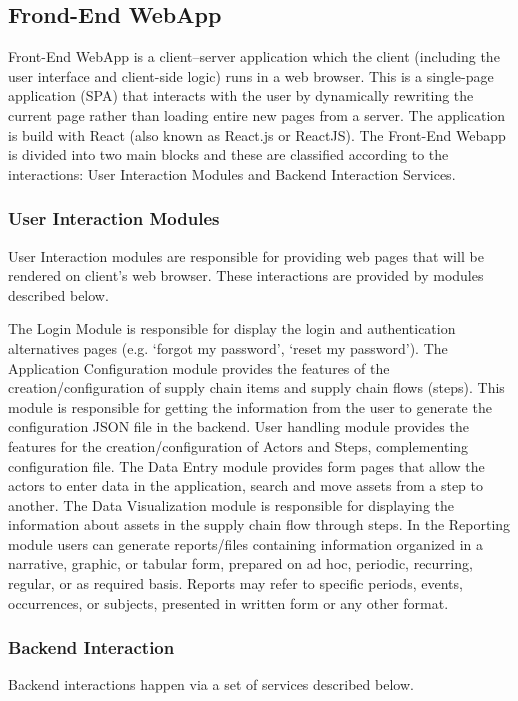 \subsection{Frond-End WebApp}\label{sec:WebAppFrondEnd}
Front-End WebApp is a client–server application which the client (including the user interface and client-side logic) runs in a web browser. This is a single-page application (SPA) that interacts with the user by dynamically rewriting the current page rather than loading entire new pages from a server. The application is build with React (also known as React.js or ReactJS). The Front-End Webapp is divided into two main blocks and these are classified according to the interactions: User Interaction Modules and Backend Interaction Services.

\subsubsection{User Interaction Modules}\label{sec:UserInteraction}
User Interaction modules are responsible for providing web pages that will be rendered on client’s web browser. These interactions are provided by modules described below.

The Login Module is responsible for display the login and authentication alternatives pages (e.g. ‘forgot my password’, ‘reset my password’). The Application Configuration module provides the features of the creation/configuration of supply chain items and supply chain flows (steps). This module is responsible for getting the information from the user to generate the configuration JSON file in the backend. User handling module provides the features for the creation/configuration of Actors and Steps, complementing configuration file. The Data Entry module provides form pages that allow the actors to enter data in the application, search and move assets from a step to another. The Data Visualization module is responsible for displaying the information about assets in the supply chain flow through steps. In the Reporting module users can generate reports/files containing information organized in a narrative, graphic, or tabular form, prepared on ad hoc, periodic, recurring, regular, or as required basis. Reports may refer to specific periods, events, occurrences, or subjects, presented in written form or any other format.

\subsubsection{Backend Interaction}\label{sec:BackendInteraction}
Backend interactions happen via a set of services described below.

